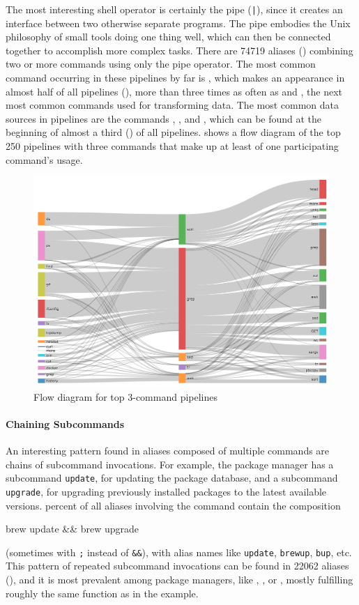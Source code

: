 The most interesting shell operator is certainly the pipe (\verb`|`), since it creates an interface between two otherwise separate programs.
The pipe embodies the Unix philosophy of small tools doing one thing well, which can then be connected together to accomplish more complex tasks.
There are \num{74719} aliases () combining two or more commands using only the pipe operator.
The most common command occurring in these pipelines by far is , which makes an appearance in almost half of all pipelines (), more than three times as often as  and , the next most common commands used for transforming data.
The most common data sources in pipelines are the commands , , and , which can be found at the beginning of almost a third () of all pipelines.
 shows a flow diagram of the top 250 pipelines with three commands that make up at least  of one participating command's usage.

\begin{figure}[h]
	\centering    
	\includegraphics[width=0.9\linewidth]{figures/flow_250.png}
	\caption{Flow diagram for top 3-command pipelines}
	\label{fig:flow}
\end{figure}

\paragraph{\bf Chaining Subcommands}

An interesting pattern found in aliases composed of multiple commands are chains of subcommand invocations.
For example, the package manager  has a subcommand \texttt{update}, for updating the package database, and a subcommand \texttt{upgrade}, for upgrading previously installed packages to the latest available versions.
 percent of all aliases involving the  command contain the composition
\begin{CVerbatim}
brew update && brew upgrade
\end{CVerbatim}
(sometimes with \verb|;| instead of \verb|&&|), with alias names like \verb|update|, \verb|brewup|, \verb|bup|, etc.
This pattern of repeated subcommand invocations can be found in \num{22062} aliases (), and it is most prevalent among package managers, like , ,  or , mostly fulfilling roughly the same function as in the  example.

